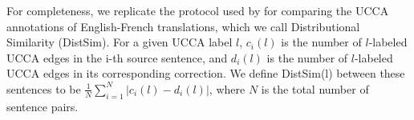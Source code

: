 \documentclass[letterpaper, 11pt]{article}
\begin{document}
For completeness, we replicate the protocol used by 
for comparing the UCCA annotations of English-French translations, which we call
Distributional Similarity ({\sc DistSim}).
For a given UCCA label $l$, $c_i(l)$ is the number of $l$-labeled UCCA edges
in the i-th source sentence, and $d_i(l)$ is the number of $l$-labeled UCCA edges
in its corresponding correction. We define {\sc DistSim}(l) between these
sentences to be $\frac{1}{N}\sum_{i=1}^N \vert c_i(l) - d_i(l) \vert$, where
$N$ is the total number of sentence pairs.
%
%
%
%
\end{document}
